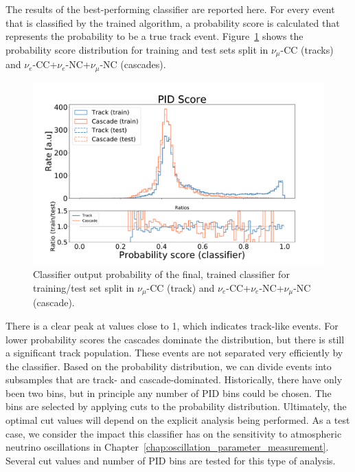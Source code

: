 The results of the best-performing classifier are reported here.
For every event that is classified by the trained algorithm, a probability score is calculated that represents the probability to be a true track event.
Figure~\ref{fig:bdt_probability_distribution} shows the probability score distribution for training and test sets split in $\nu_\mu$-CC (tracks) and $\nu_e$-CC+$\nu_e$-NC+$\nu_\mu$-NC (cascades).
\begin{figure}[h]
    \centering
    \includegraphics[trim = 35 05 110 25, clip, width=1.0\linewidth]{figures/probability_distribution.pdf}
    \caption[Classifier output probability of final, trained classifier]{Classifier output probability of the final, trained classifier for training/test set split in $\nu_\mu$-CC (track) and $\nu_e$-CC+$\nu_e$-NC+$\nu_\mu$-NC (cascade).}
    \label{fig:bdt_probability_distribution}
\end{figure}
There is a clear peak at values close to 1, which indicates track-like events.
For lower probability scores the cascades dominate the distribution, but there is still a significant track population.
These events are not separated very efficiently by the classifier.
Based on the probability distribution, we can divide events into subsamples that are track- and cascade-dominated.
Historically, there have only been two bins, but in principle any number of PID bins could be chosen.
The bins are selected by applying cuts to the probability distribution.
Ultimately, the optimal cut values will depend on the explicit analysis being performed.
As a test case, we consider the impact this classifier has on the sensitivity to atmospheric neutrino oscillations in Chapter~\ref{chap:oscillation_parameter_measurement}.
Several cut values and number of PID bins are tested for this type of analysis.

